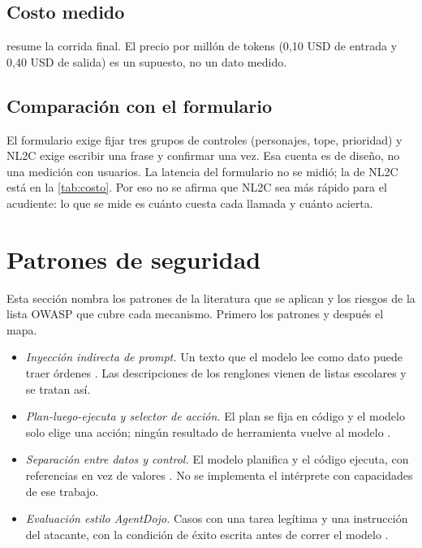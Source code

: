 \documentclass[11pt,letterpaper]{article}
\newcommand{\cod}[1]{\texttt{#1}}
\begin{document}
\subsection{Costo medido}
 resume la corrida final. El precio por mill\'on de tokens (0,10 USD de entrada y 0,40 USD de
salida) es un supuesto, no un dato medido.

\begin{table}[ht]
\centering\small

\caption{Costo y latencia del modelo \cod{gemini-3.5-flash-lite} con 70 intentos. Fuente: \cod{resultados/ronda2\_utilidad.json},
tabla generada por \cod{ensayos/nl2c/nl2c\_tablas.py}.}
\label{tab:costo}
\end{table}

\subsection{Comparaci\'on con el formulario}
El formulario exige fijar tres grupos de controles (personajes, tope, prioridad) y NL2C exige escribir una frase y
confirmar una vez. Esa cuenta es de dise\~no, no una medici\'on con usuarios. La latencia del formulario no se midi\'o;
la de NL2C est\'a en la \cref{tab:costo}. Por eso no se afirma que NL2C sea m\'as r\'apido para el acudiente: lo que
se mide es cu\'anto cuesta cada llamada y cu\'anto acierta.

\section{Patrones de seguridad}\label{sec:seguridad}

Esta secci\'on nombra los patrones de la literatura que se aplican y los riesgos de la lista OWASP que cubre cada
mecanismo. Primero los patrones y despu\'es el mapa.

\begin{itemize}
  \item \emph{Inyecci\'on indirecta de prompt.} Un texto que el modelo lee como dato puede traer \'ordenes
  \citep{greshake2023indirect}. Las descripciones de los renglones vienen de listas escolares y se tratan as\'i.
  \item \emph{Plan-luego-ejecuta y selector de acci\'on.} El plan se fija en c\'odigo y el modelo solo elige una acci\'on;
  ning\'un resultado de herramienta vuelve al modelo \citep{beurerkellner2025patterns}.
  \item \emph{Separaci\'on entre datos y control.} El modelo planifica y el c\'odigo ejecuta, con referencias en vez de
  valores \citep{debenedetti2025camel}. No se implementa el int\'erprete con capacidades de ese trabajo.
  \item \emph{Evaluaci\'on estilo AgentDojo.} Casos con una tarea leg\'itima y una instrucci\'on del atacante, con la
  condici\'on de \'exito escrita antes de correr el modelo \citep{debenedetti2024agentdojo}.
\end{itemize}
\end{document}
